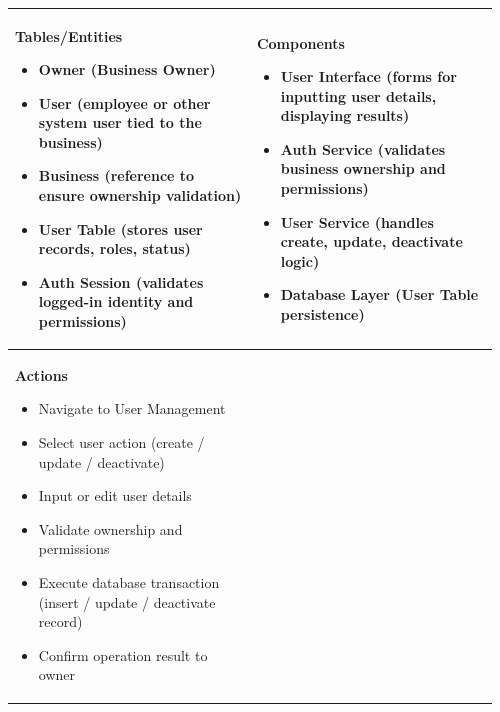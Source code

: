 \documentclass[]{VUMIFTemplateClass}
\newenvironment{mpitemlist}[1][\linewidth]{%
    \begin{minipage}[t]{#1}%
        \setlength{\leftmargini}{12pt}%
        \begin{itemize}%
            \setlength{\itemsep}{1pt}%
            \setlength{\parskip}{0pt}%
            \setlength{\parsep}{0pt}%
}{%
        \end{itemize}%
    \end{minipage}\newline
}
\begin{document}
\begin{center}
\setlength{\tabcolsep}{8pt}
\begin{tabular}{|p{0.48\linewidth}|p{0.48\linewidth}|}
\hline
\textbf{Tables/Entities} \newline
\begin{mpitemlist}
\item Owner (Business Owner)
\item User (employee or other system user tied to the business)
\item Business (reference to ensure ownership validation)
\item User Table (stores user records, roles, status)
\item Auth Session (validates logged-in identity and permissions)
\end{mpitemlist}
&
\textbf{Components} \newline
\begin{mpitemlist}
\item User Interface (forms for inputting user details, displaying results)
\item Auth Service (validates business ownership and permissions)
\item User Service (handles create, update, deactivate logic)
\item Database Layer (User Table persistence)
\end{mpitemlist}
\\ \hline
\textbf{Actions} \newline
\begin{mpitemlist}
\item Navigate to User Management
\item Select user action (create / update / deactivate)
\item Input or edit user details
\item Validate ownership and permissions
\item Execute database transaction (insert / update / deactivate record)
\item Confirm operation result to owner
\end{mpitemlist}
&

\\ \hline
\end{tabular}
\end{center}
\end{document}
